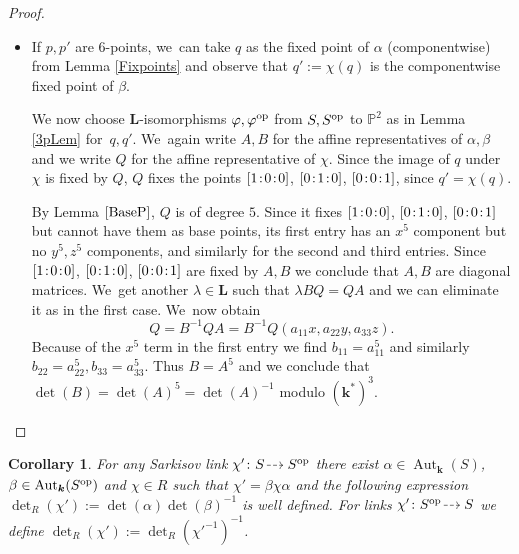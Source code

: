 \documentclass[JEP,XML,SOM,Unicode,NoFloatCountersInSection, NoEqCountersInSection,published]{cedram}
\newcommand{\dradpl}{{\hspace*{-2mm}\begin{tikzcd}[ampersand replacement=\&,column sep = scriptsize]\mbox{}\ar[r,dashed]\&\mbox{}\end{tikzcd}\hspace*{-2mm}}}
\newcommand{\dratst}{{\hspace*{-2.5mm}\begin{tikzcd}[ampersand replacement=\&,column sep = small]\mbox{}\ar[r,dashed]\&\mbox{}\end{tikzcd}\hspace*{-2mm}}}
\let\drascst\dratst
\newcommand{\dra}{\mathchoice{\dradpl}{\dratst}{\drascst}{\drascst}}
\newcommand{\op}{\textup{op}}
\newcommand{\sep}{\mkern2mu{:}\mkern2mu}
\newtheorem{corollary}[theorem]{Corollary}
\theoremstyle{definition}
\newcommand{\kk}{{\boldsymbol{k}}}
\newcommand{\LL}{{\boldsymbol{L}}}
\DeclareMathOperator{\Aut}{Aut}
\begin{document}
\begin{proof}
\begin{itemize}
In the case where the splitting field has degree $6$, it can also not correspond to a $3$\nobreakdash-cycle with the same type of argument. We~see in the case of a degree-$3$ splitting field $A_g, A_g^{\op}$ from Lemma \ref{3pLem} satisfy the condition to be representatives of $\kk$-automorphisms since for $A = A_g$ we have $A^g = A_g = A_g^{-1}A A_g$ and similarly for~$A_g^{\op}$. Therefore, we~can take $A = D_A A_g^{i_A}$, $B = D_B (A_g^{\op})^{i_B}$, where $0 \leq i_A,i_B \leq 2$ and $D_A,D_B$ are diagonal matrices. We~find there exists $\lambda \in \LL$ such that $\lambda B \Sigma = \Sigma A$, but since both $ B \Sigma $, $\Sigma A$ are affine representatives, we~have $\lambda \in \kk$, thus by changing $B$ we may assume $\lambda = 1$. Then
\[
D_B (A_g^{\op})^{i_B} \Sigma = B \Sigma = \Sigma A = \det(D_A) \xi^{i_A} D_A^{-1} (A_g^{\op})^{i_A} \Sigma
\]
(in affine coordinates). Then we~find
\[
\det(B) = \det(D_A)^2 \xi^{2i_A} = \det(A)^2 = \det(A)^{-1}
\]
in $\kk^*/(\kk^*)^3$.
\item If $p,p'$ are $6$\nobreakdash-points, we~can take $q$ as the fixed point of $\alpha$ (componentwise) from Lemma \ref{Fixpoints} and observe that $q' := \chi(q)$ is the componentwise fixed point of $\beta$.

We now choose $\LL$-isomorphisms $\varphi, \varphi^{\op}$ from $S,S^{\op}$ to $\mathbb{P}^2$ as in Lemma \ref{3pLem} for~$q,q'$. We~again write $A,B$ for the affine representatives of $\alpha, \beta$ and we write $Q$ for the affine representative of $\chi$. Since the image of $q$ under $\chi$ is fixed by $Q$, $Q$ fixes the points $[1\sep 0\sep 0]$, $[0\sep 1\sep 0]$, $[0\sep 0\sep 1]$, since $q' = \chi(q)$.

By Lemma $\ref{BaseP}$, $Q$ is of degree $5$. Since it fixes $[1\sep 0\sep 0]$, $[0\sep 1\sep 0]$, $[0\sep 0\sep 1]$ but cannot have them as base points, its first entry has an $x^5$ component but no $y^5,z^5$ components, and similarly for the second and third entries. Since $[1\sep 0\sep 0]$, $[0\sep 1\sep 0]$, $[0\sep 0\sep 1]$ are fixed by $A,B$ we conclude that $A,B$ are diagonal matrices. We~get another $\lambda \in \LL$ such that $\lambda B Q = Q A$ and we can eliminate it as in the first case. We~now obtain
\[
Q = B^{-1}Q A = B^{-1}Q(a_{11}x, a_{22}y, a_{33}z).
\]
Because of the $x^5$ term in the first entry we find $b_{11} = a_{11}^5$ and similarly $b_{22} = a_{22}^5, b_{33} = a_{33}^5$. Thus $B = A^5$ and we conclude that $\det(B) = \det(A)^5 = \det(A)^{-1}$ modulo $(\kk^*)^3$.\qedhere
\end{itemize}
\end{proof}
\begin{corollary}
For any Sarkisov link $\chi' \colon S \dra S^{\op}$ there exist $\alpha \in \Aut_{\kk}(S)$, $\beta \in \Aut_{\kk}(S^{\op})$ and $\chi \in R$ such that $\chi' = \beta \chi \alpha$ and the following expression $\det_R(\chi') := \det(\alpha) \det(\beta)^{-1}$ is well defined. For links $\chi' \colon S^{\op} \dra S$ we define $\det_R(\chi') := \det_R(\chi'^{-1})^{-1}$.
\end{corollary}
\end{document}
